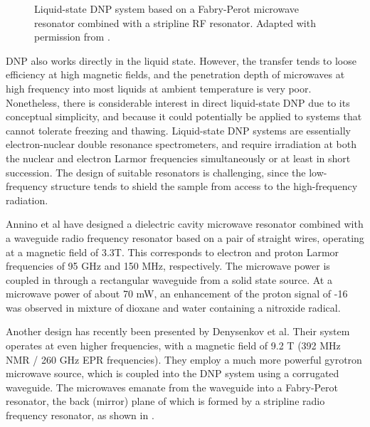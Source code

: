 \begin{figure}
	\begin{center}
	\end{center}
	\caption{Liquid-state DNP system based on a Fabry-Perot microwave resonator combined
	with a stripline RF resonator. Adapted with permission from \cite{Denysenkov:2012jy}.}
	\label{fig-Denysenkov-2012jy}
\end{figure}

DNP also works directly in the liquid state. However, the transfer tends to loose
efficiency at high magnetic fields, and the penetration depth of
microwaves at high frequency into most liquids at ambient temperature is
very poor. Nonetheless, there is considerable interest in direct
liquid-state DNP \cite{Loening:2002wg,Lingwood:2009jy,Griffin:2010cu} due
to its conceptual simplicity, and because it could potentially be
applied to systems that cannot tolerate freezing and thawing.
Liquid-state DNP systems are essentially electron-nuclear double
resonance spectrometers, and require irradiation at both the nuclear and
electron Larmor frequencies simultaneously or at least in short
succession. The design of suitable resonators is challenging, since the
low-frequency structure tends to shield the sample from access to the
high-frequency radiation. 

Annino et al
\cite{Annino:2009gd,VillanuevaGaribay:2010cu,vanBentum:2011km} have
designed a dielectric cavity microwave resonator combined with a
waveguide radio frequency resonator based on a pair of straight wires,
operating at a magnetic field of 3.3T. This corresponds to electron and
proton Larmor frequencies of 95 GHz and 150 MHz, respectively. The
microwave power is coupled in through a rectangular waveguide from a
solid state source. At a microwave power of about 70 mW, an enhancement
of the proton signal of -16 was observed in mixture of dioxane and water
containing a nitroxide radical. 

Another design has recently been
presented by Denysenkov et al.
\cite{Denysenkov:2010hy,Denysenkov:2008gf,Denysenkov:2012jy,Prandolini:2009he}
Their system operates at even higher frequencies, with a magnetic field
of 9.2 T (392 MHz NMR / 260 GHz EPR frequencies). They employ a much
more powerful gyrotron microwave source, which is coupled into the DNP
system using a corrugated waveguide. The microwaves emanate from the
waveguide into a Fabry-Perot resonator, the back (mirror) plane of which
is formed by a stripline radio frequency resonator, as shown in .

